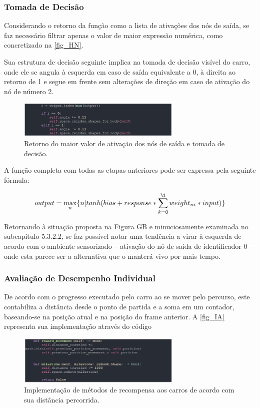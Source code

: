 \subsubsection{Tomada de Decisão}
Considerando o retorno da função como a lista de ativações dos nós de saída, se faz necessário filtrar apenas o valor de maior expressão numérica, como concretizado na \autoref{fig_HN}.

Sua estrutura de decisão seguinte implica na tomada de decisão visível do carro, onde ele se angula à esquerda em caso de saída equivalente a 0, à direita ao retorno de 1 e segue em frente sem alterações de direção em caso de ativação do nó de número 2.

\begin{figure}[htb]
        \centering
        \caption{\label{fig_HN}Retorno do maior valor de ativação dos nós de saída e tomada de decisão.}
        \includegraphics[width=0.7\textwidth]{images/HN.png}
\end{figure}

A função completa com todas as etapas anteriores pode ser expressa pela seguinte fórmula:

\[ output = \max_{n}\{n | tanh(bias + response * \sum_{k=0}^{\i} weight_{ni}*input)\} \]

Retornando à situação proposta na Figura GB e minuciosamente examinada no subcapítulo 5.3.2.2, se faz possível notar uma tendência a virar à esquerda de acordo com o ambiente sensorizado – ativação do nó de saída de identificador 0 – onde esta parece ser a alternativa que o manterá vivo por mais tempo.

\subsubsection{Avaliação de Desempenho Individual}
De acordo com o progresso executado pelo carro ao se mover pelo percurso, este contabiliza a distância desde o ponto de partida e a soma em um contador, baseando-se na posição atual e na posição do frame anterior. A \autoref{fig_IA} representa sua implementação através do código 

\begin{figure}[htb]
        \centering
        \caption{\label{fig_IA}Implementação de métodos de recompensa aos carros de acordo com sua distância percorrida.}
        \includegraphics[width=0.7\textwidth]{images/IA.png}
\end{figure}

